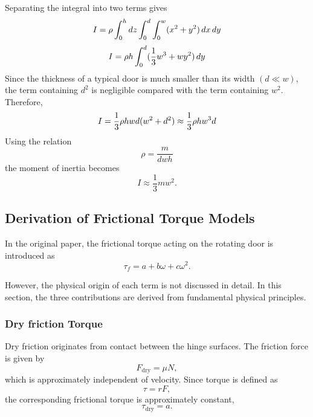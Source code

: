 \documentclass[11pt,letterpaper]{article}
\begin{document}
Separating the integral into two terms gives
\begin{equation}
I=\rho\int_0^{h}dz\int_{0}^{d}\int_0^w(x^2+y^2)\,dx\,dy\\
\end{equation}
\begin{equation}
I=\rho h\int_{0}^{d}(\frac{1}{3}w^3+wy^2)\,dy\\
\end{equation}
Since the thickness of a typical door is much smaller than its width $(d \ll w)$, the term containing $d^2$ is negligible compared with the term containing $w^2$. Therefore,
\begin{equation}
I=\frac{1}{3}\rho hwd(w^2+d^2)\approx\frac{1}{3}\rho hw^3d\\
\end{equation}
Using the relation
\begin{equation}
\rho=\frac{m}{dwh}
\end{equation}
the moment of inertia becomes
\begin{equation}
I \approx \frac{1}{3}mw^2.
\end{equation}

\subsection{Derivation of Frictional Torque Models}
In the original paper, the frictional torque acting on the rotating door is introduced as
\begin{equation}
\tau_f = a + b\omega + c\omega^2.
\end{equation}

However, the physical origin of each term is not discussed in detail. In this section, the three contributions are derived from fundamental physical principles.
\subsubsection{Dry friction Torque}
Dry friction originates from contact between the hinge surfaces. The friction force is given by
\begin{equation}
F_{\mathrm{dry}}=\mu N,
\end{equation}
which is approximately independent of velocity. Since torque is defined as
\begin{equation}
\tau=rF,
\end{equation}
the corresponding frictional torque is approximately constant,
\begin{equation}
\tau_{\mathrm{dry}}=a.
\end{equation}
\end{document}
